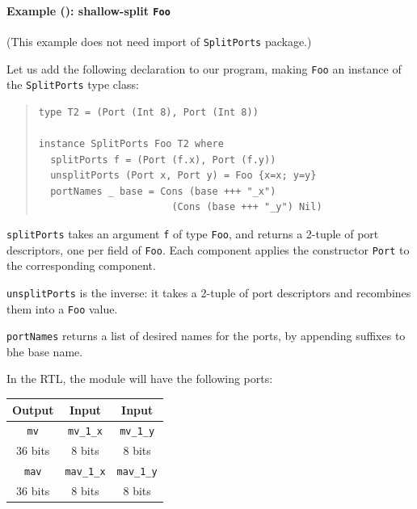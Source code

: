 
\paragraph{Example (\BH): shallow-split {\tt Foo}}

\label{sec:splitports_examples_BH_Foo_Shallow}

\hspace*{1em}

{\footnotesize (This example does not need import of {\tt SplitPorts} package.)}

Let us add the following declaration to our program, making {\tt Foo}
an instance of the {\tt SplitPorts} type class:

\begin{quote}
\begin{verbatim}
type T2 = (Port (Int 8), Port (Int 8))

instance SplitPorts Foo T2 where
  splitPorts f = (Port (f.x), Port (f.y))
  unsplitPorts (Port x, Port y) = Foo {x=x; y=y}
  portNames _ base = Cons (base +++ "_x")
                       (Cons (base +++ "_y") Nil)
\end{verbatim}
\end{quote}

{\tt splitPorts} takes an argument {\tt f} of type {\tt Foo}, and
returns a 2-tuple of port descriptors, one per field of {\tt Foo}.
Each component applies the constructor {\tt Port} to the corresponding
component.

{\tt unsplitPorts} is the inverse: it takes a 2-tuple of port
descriptors and recombines them into a {\tt Foo} value.

{\tt portNames} returns a list of desired names for the ports, by
appending suffixes to bhe base name.

In the RTL, the module will have the following ports:

\begin{center}
  \begin{tabular}{|c||c|c|}
    \hline
     Output &
     Input  &
     Input  \\
    \hline
     {\tt mv}       &
     {\tt mv\_1\_x} &
     {\tt mv\_1\_y} \\
     36 bits &
      8 bits &
      8 bits \\
    \hline
     {\tt mav}       &
     {\tt mav\_1\_x} &
     {\tt mav\_1\_y} \\
     36 bits &
      8 bits &
      8 bits \\
    \hline
  \end{tabular}
\end{center}

